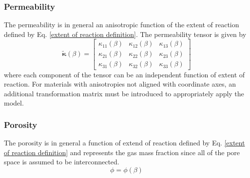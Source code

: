 \subsubsection{Permeability}
The permeability is in general an anisotropic function of the extent of reaction defined by Eq. \ref{extent of reaction definition}.  The permeability tensor is given by
\begin{equation}
\widetilde{\boldsymbol{\kappa}}\left(\beta\right) = \left[ \begin{matrix}
\kappa_{11}\left(\beta\right) & \kappa_{12}\left(\beta\right) & \kappa_{13}\left(\beta\right) \\
\kappa_{21}\left(\beta\right) & \kappa_{22}\left(\beta\right) & \kappa_{23}\left(\beta\right) \\
\kappa_{31}\left(\beta\right) & \kappa_{32}\left(\beta\right) & \kappa_{33}\left(\beta\right) \end{matrix} \right]
\end{equation}
where each component of the tensor can be an independent function of extent of reaction.  For materials with anisotropies not aligned with coordinate axes, an additional transformation matrix must be introduced to appropriately apply the model.
\subsubsection{Porosity}
The porosity is in general a function of extend of reaction defined by Eq. \ref{extent of reaction definition} and represents the gas mass fraction since all of the pore space is assumed to be interconnected.
\begin{equation}
  \phi = \phi\left(\beta\right)
\end{equation}
